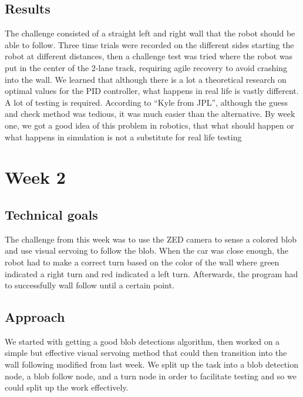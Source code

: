 \documentclass[journal, a4paper]{IEEEtran}
\begin{document}
\subsection{Results}
The challenge consisted of a straight left and right wall that the robot should be able to follow. Three time trials were recorded on the different sides starting the robot at different distances, then a challenge test was tried where the robot was put in the center of the 2-lane track, requiring agile recovery to avoid crashing into the wall. We learned that although there is a lot a theoretical research on optimal values for the PID controller, what happens in real life is vastly different. A lot of testing is required. According to “Kyle from JPL”, although the guess and check method was tedious, it was much easier than the alternative. By week one, we got a good idea of this problem in robotics, that what should happen or what happens in simulation is not a substitute for real life testing

\section{Week 2}
\subsection{Technical goals}
The challenge from this week was to use the ZED camera to sense a colored blob and use visual servoing to follow the blob. When the car was close enough, the robot had to make a correct turn based on the color of the wall where green indicated a right turn and red indicated a left turn. Afterwards, the program had to successfully wall follow until a certain point. 
\subsection{Approach}
We started with getting a good blob detections algorithm, then worked on a simple but effective visual servoing method that could then transition into the wall following modified from last week. We split up the task into a blob detection node, a blob follow node, and a turn node in order to facilitate testing and so we could split up the work effectively. 
\end{document}
